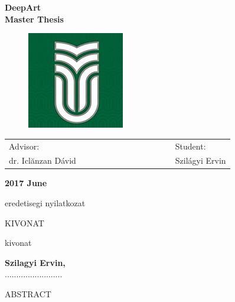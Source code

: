 \documentclass[12pt, a4paper, oneside]{book}
\theoremstyle{tetel}
\begin{document}
\begin{center}
    \vspace{3cm}\LARGE \textbf{DeepArt}\\
    \vspace{1cm}\LARGE \textbf{Master Thesis}\\
\end{center}

\vspace{2cm}
\begin{figure}[htb]
\hspace{5.7cm}\includegraphics[bb = 0 0 160 160]{sapi.jpg}
\end{figure}

\vspace{2cm}
\begin{center}
\begin{tabular}{lcccccccccccl}
     Advisor: & & &&&& &&&&&& Student:\\
     dr. Iclănzan Dávid &&&&&& &&&&&& Szilágyi Ervin\\
\end{tabular}
\end{center}

\begin{center}
    \vspace{1cm}\textbf{2017 June}
\end{center}

\newpage
\thispagestyle{empty}
eredetisegi nyilatkozat
\newpage
\thispagestyle{empty}
\begin{center}
    \Large KIVONAT
\end{center}

kivonat

\begin{flushright}
\textbf{Szilagyi Ervin,}\\
.........................
\end{flushright}

\newpage
\thispagestyle{empty}
\begin{center}
    \Large ABSTRACT
\end{center}
\end{document}
